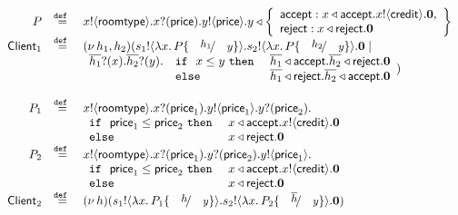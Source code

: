 \newcommand{\rtype}{\mathsf{roomtype}}
\newcommand{\price}{\mathsf{price}}
\newcommand{\accept}{\mathsf{accept}}
\newcommand{\reject}{\mathsf{reject}}
\newcommand{\creditc}{\mathsf{credit}}

\newcommand{\Client}{\mathsf{Client}}

\[
	\begin{array}{rcl}
		P &\defeq& \bout{x}{\rtype} \binp{x}{\price} \bout{y}{\price}
		y \triangleleft \left\{
				\begin{array}{l}
					\accept: \bsel{x}{\accept} \bout{x}{\creditc} \inact,\\
					\reject: \bsel{x}{\reject} \inact
				\end{array}
				\right\}
		\\
		\Client_1 &\defeq& \newsp{h_1, h_2}{\bout{s_1}{\abs{x}{P \subst{h_1}{y}}} \bout{s_2}{\abs{x}{P \subst{h_2}{y}}} \inact \Par\\
			&&
			\begin{array}{lll}
				\binp{\dual{h_1}}{x} \binp{\dual{h_2}}{y} & \If\ x \leq y\ \Then & \bsel{\dual{h_1}}{\accept} \bsel{\dual{h_2}}{\reject} \inact\\
				& \Else& \bsel{\dual{h_1}}{\reject} \bsel{\dual{h_2}}{\accept} \inact
			\end{array}
		}
		\\
		\\
		P_1 &\defeq&	\bout{x}{\rtype} \binp{x}{\price_1} \bout{y}{\price_1} \binp{y}{\price_2}\\
			&&
				\begin{array}{ll}
					\If\ \price_1 \leq \price_2\ \Then & \bsel{x}{\accept} \bout{x}{\creditc} \inact\\
					\Else & \bsel{x}{\reject} \inact
				\end{array}
		\\
		P_2 &\defeq&	\bout{x}{\rtype} \binp{x}{\price_1} \binp{y}{\price_2} \bout{y}{\price_1}\\
			&&
				\begin{array}{ll}
					\If\ \price_1 \leq \price_2\ \Then & \bsel{x}{\accept} \bout{x}{\creditc} \inact\\
					\Else & \bsel{x}{\reject} \inact
				\end{array}
		\\
		\Client_2 &\defeq& \newsp{h}{\bout{s_1}{\abs{x}{P_1 \subst{h}{y}}} \bout{s_2}{\abs{x}{P_2 \subst{\dual{h}}{y}}} \inact}
	\end{array}
\]

